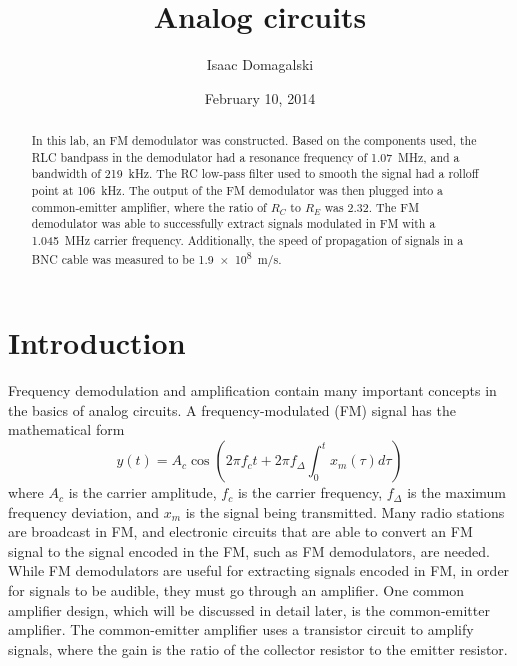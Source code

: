 \documentclass[11pt,letterpaper]{article}
\title{Analog circuits}
\author{Isaac Domagalski}
\date{February 10, 2014}
\begin{document}
\maketitle

\begin{abstract}
    In this lab, an FM demodulator was constructed. Based on the components
    used, the RLC bandpass in the demodulator had a resonance frequency of 
    \SI{1.07}{\mega\hertz}, and a bandwidth of \SI{219}{\kilo\hertz}. The RC
    low-pass filter used to smooth the signal had a rolloff point at
    \SI{106}{\kilo\hertz}. The output of the FM demodulator was then plugged
    into a common-emitter amplifier, where the ratio of $R_C$ to $R_E$ was 2.32.
    The FM demodulator was able to successfully extract signals modulated in FM
    with a \SI{1.045}{\mega\hertz} carrier frequency. Additionally, the speed of
    propagation of signals in a BNC cable was measured to be
    \SI{1.9e8}{\meter/\second}.
\end{abstract}

\section{Introduction}

Frequency demodulation and amplification contain many important concepts in the
basics of analog circuits. A frequency-modulated (FM) signal has the
mathematical form \cite{FMWikipedia}
\begin{equation}
    y\left(t\right) = A_c \cos\left(2\pi f_c t +
    2 \pi f_{\Delta} \int_0^t x_m\left(\tau\right) d\tau
    \right)
\end{equation}
where $A_c$ is the carrier amplitude, $f_c$ is the carrier frequency,
$f_{\Delta}$ is the maximum frequency deviation, and $x_m$ is the signal being
transmitted. Many radio stations are broadcast in FM, and electronic circuits
that are able to convert an FM signal to the signal encoded in the FM, such as
FM demodulators, are needed. While FM demodulators are useful for extracting
signals encoded in FM, in order for signals to be audible, they must go through
an amplifier. One common amplifier design, which will be discussed in detail
later, is the common-emitter amplifier. The common-emitter amplifier uses a
transistor circuit to amplify signals, where the gain is the ratio of the
collector resistor to the emitter resistor.
\\
\end{document}

